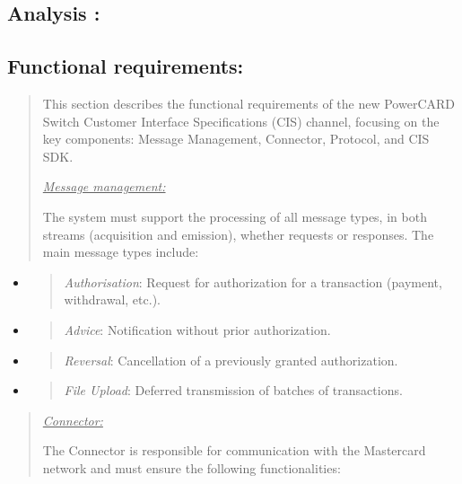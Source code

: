 \documentclass[12pt,a4paper]{report}
\begin{document}
\hypertarget{analysis}{%
\subsection{\texorpdfstring{\textbf{Analysis
:}}{Analysis :}}\label{analysis}}

\hypertarget{functional-requirements}{%
\subsection{\texorpdfstring{\textbf{Functional
requirements:}}{Functional requirements:}}\label{functional-requirements}}

\begin{quote}
This section describes the functional requirements of the new PowerCARD
Switch Customer Interface Specifications (CIS) channel, focusing on the
key components: Message Management, Connector, Protocol, and CIS SDK.

\emph{\uline{Message management:}}

The system must support the processing of all message types, in both
streams (acquisition and emission), whether requests or responses. The
main message types include:
\end{quote}

\begin{itemize}
\item
  \begin{quote}
  \emph{Authorisation}: Request for authorization for a transaction
  (payment, withdrawal, etc.).
  \end{quote}
\item
  \begin{quote}
  \emph{Advice}: Notification without prior authorization.
  \end{quote}
\item
  \begin{quote}
  \emph{Reversal}: Cancellation of a previously granted authorization.
  \end{quote}
\item
  \begin{quote}
  \emph{File Upload}: Deferred transmission of batches of transactions.
  \end{quote}
\end{itemize}

\begin{quote}
\emph{\uline{Connector:}}

The Connector is responsible for communication with the Mastercard
network and must ensure the following functionalities:
\end{quote}
\end{document}
